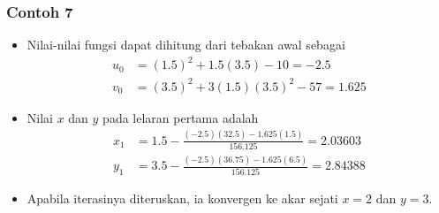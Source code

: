 \documentclass[pdflatex,compress]{beamer}
\begin{document}
\begin{frame}
	\frametitle{Contoh 7}
	\begin{itemize}
		\item Nilai-nilai fungsi dapat dihitung dari tebakan awal sebagai
		\begin{align*}
		u_0 &= (1.5)^2 + 1.5(3.5) - 10 = -2.5 \\
		v_0 &= (3.5)^2 + 3(1.5)(3.5)^2 - 57 = 1.625
		\end{align*}
		\item Nilai $ x $ dan $ y $ pada lelaran pertama adalah
		\begin{align*}
		x_1 &= 1.5 - \frac{(-2.5)(32.5) - 1.625(1.5)}{156.125} = 2.03603 \\
		y_1 &= 3.5 - \frac{(-2.5)(36.75) - 1.625(6.5)}{156.125} = 2.84388
		\end{align*}
		\item Apabila iterasinya diteruskan, ia konvergen ke akar sejati $ x = 2 $ dan $ y = 3 $.
	\end{itemize}
\end{frame}
\end{document}
